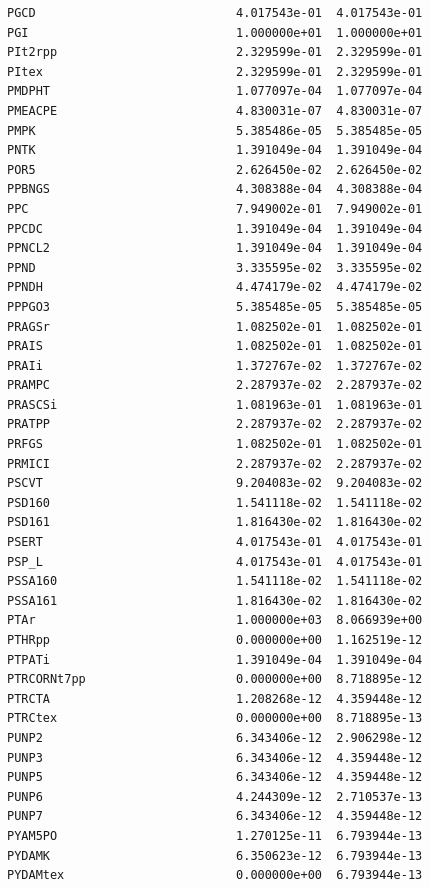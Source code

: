 \documentclass{scrartcl}
\begin{document}
\begin{enumerate}
\begin{lstlisting}
PGCD                            4.017543e-01  4.017543e-01
PGI                             1.000000e+01  1.000000e+01
PIt2rpp                         2.329599e-01  2.329599e-01
PItex                           2.329599e-01  2.329599e-01
PMDPHT                          1.077097e-04  1.077097e-04
PMEACPE                         4.830031e-07  4.830031e-07
PMPK                            5.385486e-05  5.385485e-05
PNTK                            1.391049e-04  1.391049e-04
POR5                            2.626450e-02  2.626450e-02
PPBNGS                          4.308388e-04  4.308388e-04
PPC                             7.949002e-01  7.949002e-01
PPCDC                           1.391049e-04  1.391049e-04
PPNCL2                          1.391049e-04  1.391049e-04
PPND                            3.335595e-02  3.335595e-02
PPNDH                           4.474179e-02  4.474179e-02
PPPGO3                          5.385485e-05  5.385485e-05
PRAGSr                          1.082502e-01  1.082502e-01
PRAIS                           1.082502e-01  1.082502e-01
PRAIi                           1.372767e-02  1.372767e-02
PRAMPC                          2.287937e-02  2.287937e-02
PRASCSi                         1.081963e-01  1.081963e-01
PRATPP                          2.287937e-02  2.287937e-02
PRFGS                           1.082502e-01  1.082502e-01
PRMICI                          2.287937e-02  2.287937e-02
PSCVT                           9.204083e-02  9.204083e-02
PSD160                          1.541118e-02  1.541118e-02
PSD161                          1.816430e-02  1.816430e-02
PSERT                           4.017543e-01  4.017543e-01
PSP_L                           4.017543e-01  4.017543e-01
PSSA160                         1.541118e-02  1.541118e-02
PSSA161                         1.816430e-02  1.816430e-02
PTAr                            1.000000e+03  8.066939e+00
PTHRpp                          0.000000e+00  1.162519e-12
PTPATi                          1.391049e-04  1.391049e-04
PTRCORNt7pp                     0.000000e+00  8.718895e-12
PTRCTA                          1.208268e-12  4.359448e-12
PTRCtex                         0.000000e+00  8.718895e-13
PUNP2                           6.343406e-12  2.906298e-12
PUNP3                           6.343406e-12  4.359448e-12
PUNP5                           6.343406e-12  4.359448e-12
PUNP6                           4.244309e-12  2.710537e-13
PUNP7                           6.343406e-12  4.359448e-12
PYAM5PO                         1.270125e-11  6.793944e-13
PYDAMK                          6.350623e-12  6.793944e-13
PYDAMtex                        0.000000e+00  6.793944e-13

\end{lstlisting}
\end{enumerate}
\end{document}
